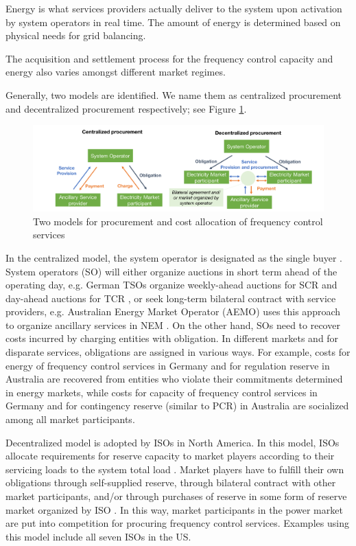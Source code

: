 Energy is what services providers actually deliver to the system upon activation by system operators in real time. The amount of energy is determined based on physical needs for grid balancing.

The acquisition and settlement process for the frequency control capacity and energy also varies amongst different market regimes.

Generally, two models are identified. We name them as centralized procurement and decentralized procurement respectively; see Figure \ref{fig:FCR_market-model}.

\begin{figure}[h!]
	\centering
	\includegraphics[width=1.05\linewidth]{Figures/FCR_market_model}
	\caption{Two models for procurement and cost allocation of frequency control services}
	\label{fig:FCR_market-model}
\end{figure}

In the centralized model, the system operator is designated as the single buyer \cite{Rebours2009}. System operators (SO) will either organize auctions in short term ahead of the operating day, e.g. German TSOs organize weekly-ahead auctions for SCR and day-ahead auctions for TCR \cite{ConsentecGmbH2014}, or seek long-term bilateral contract with service providers, e.g. Australian Energy Market Operator (AEMO) uses this approach to organize ancillary services in NEM \cite{AEMO2015}. On the other hand, SOs need to recover costs incurred by charging entities with obligation. In different markets and for disparate services, obligations are assigned in various ways. For example, costs for energy of frequency control services in Germany and for regulation reserve in Australia are recovered from entities who violate their commitments determined in energy markets, while costs for capacity of frequency control services in Germany and for contingency reserve (similar to PCR) in Australia are socialized among all market participants. 

Decentralized model is adopted by ISOs in North America. In this model, ISOs allocate requirements for reserve capacity to market players according to their servicing loads to the system total load \cite{Rebours2009,EllisonJ.F.TesfatsionL.S.LooseV.W.Byrne2012,PJM2017b}. Market players have to fulfill their own obligations through self-supplied reserve, through bilateral contract with other market participants, and/or through purchases of reserve in some form of reserve market organized by ISO \cite{EllisonJ.F.TesfatsionL.S.LooseV.W.Byrne2012}. In this way, market participants in the power market are put into competition for procuring frequency control services. Examples using this model include all seven ISOs in the US.

